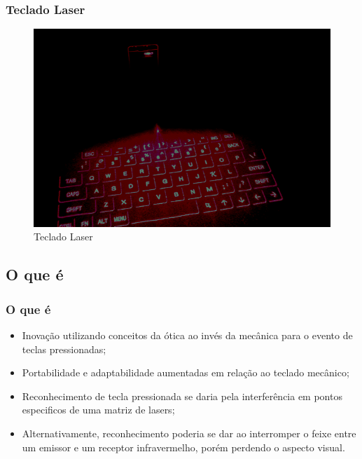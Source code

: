 \documentclass[hyperref={pdfpagelabels=false}]{beamer}
\begin{document}
        \begin{frame}\frametitle{Teclado Laser}

            \begin{figure}
                \includegraphics[scale=0.5]{Imagens/Ideia_de_projeto/teclado.png}
                \caption{Teclado Laser}
            \end{figure}

        \end{frame}

        \subsection{O que é}

             \begin{frame}\frametitle{O que é}

                \begin{itemize}
                    \item Inovação utilizando conceitos da ótica ao invés da mecânica para o evento de teclas pressionadas;
                    \item Portabilidade e adaptabilidade aumentadas em relação ao teclado mecânico;
                    \item Reconhecimento de tecla pressionada se daria pela interferência em pontos especificos de uma matriz de lasers;
                    \item Alternativamente, reconhecimento poderia se dar ao interromper o feixe entre um emissor e um receptor infravermelho, porém perdendo o aspecto visual.
                \end{itemize}

            \end{frame}
\end{document}
